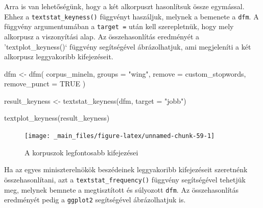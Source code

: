 \documentclass[
]{book}
\newenvironment{Shaded}{\begin{snugshade}}{\end{snugshade}}
\newcommand{\AttributeTok}[1]{\textcolor[rgb]{0.77,0.63,0.00}{#1}}
\newcommand{\ConstantTok}[1]{\textcolor[rgb]{0.00,0.00,0.00}{#1}}
\newcommand{\FunctionTok}[1]{\textcolor[rgb]{0.00,0.00,0.00}{#1}}
\newcommand{\NormalTok}[1]{#1}
\newcommand{\OtherTok}[1]{\textcolor[rgb]{0.56,0.35,0.01}{#1}}
\newcommand{\StringTok}[1]{\textcolor[rgb]{0.31,0.60,0.02}{#1}}
\begin{document}
Arra is van lehetőségünk, hogy a két alkorpuszt hasonlítsuk össze
egymással. Ehhez a \texttt{textstat\_keyness()} függvényt haszáljuk,
melynek a bemenete a \texttt{dfm}. A függvény argumentumában a
\texttt{target\ =} után kell szerepletnük, hogy mely alkorpusz a
viszonyítási alap. Az összehasonlítás eredményét a 'textplot\_keyness()`
függvény segítségével ábrázolhatjuk, ami megjeleníti a két alkorpusz
leggyakoribb kifejezéseit.

\begin{Shaded}
\begin{Highlighting}[]
\NormalTok{dfm }\OtherTok{\textless{}{-}} \FunctionTok{dfm}\NormalTok{(}
\NormalTok{  corpus\_mineln,}
  \AttributeTok{groups =} \StringTok{"wing"}\NormalTok{, }
  \AttributeTok{remove =}\NormalTok{ custom\_stopwords,}
  \AttributeTok{remove\_punct =} \ConstantTok{TRUE}
\NormalTok{)}

\NormalTok{result\_keyness }\OtherTok{\textless{}{-}} \FunctionTok{textstat\_keyness}\NormalTok{(dfm, }\AttributeTok{target =} \StringTok{"jobb"}\NormalTok{)}
\end{Highlighting}
\end{Shaded}

\begin{Shaded}
\begin{Highlighting}[]
\FunctionTok{textplot\_keyness}\NormalTok{(result\_keyness)}
\end{Highlighting}
\end{Shaded}

\begin{figure}

{\centering \texttt{[image: \_main\_files/figure-latex/unnamed-chunk-59-1]} 

}

\caption{A korpuszok legfontosabb kifejezései}\label{fig:unnamed-chunk-59}
\end{figure}

Ha az egyes miniszterelnökök beszédeinek leggyakoribb kifejezéseit
szeretnénk összehasonlítani, azt a \texttt{textstat\_frequency()}
függvény segítségével tehetjük meg, melynek bemnete a megtisztított és
súlyozott \texttt{dfm}. Az összehasonlítás eredményét pedig a
\texttt{ggplot2} segítségével ábrázolhatjuk is.
\end{document}
